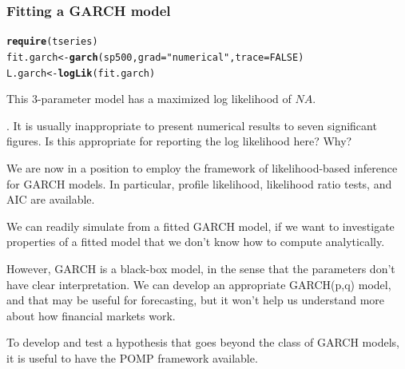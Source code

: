 \documentclass{beamer}\usepackage[]{graphicx}\usepackage[]{color}
\makeatletter
\newcommand{\hlnum}[1]{\textcolor[rgb]{0.686,0.059,0.569}{#1}}%
\newcommand{\hlstr}[1]{\textcolor[rgb]{0.192,0.494,0.8}{#1}}%
\newcommand{\hlstd}[1]{\textcolor[rgb]{0.345,0.345,0.345}{#1}}%
\newcommand{\hlkwb}[1]{\textcolor[rgb]{0.69,0.353,0.396}{#1}}%
\newcommand{\hlkwc}[1]{\textcolor[rgb]{0.333,0.667,0.333}{#1}}%
\newcommand{\hlkwd}[1]{\textcolor[rgb]{0.737,0.353,0.396}{\textbf{#1}}}%
\newenvironment{kframe}{%
 \def\at@end@of@kframe{}%
 \ifinner\ifhmode%
  \def\at@end@of@kframe{\end{minipage}}%
  \begin{minipage}{\columnwidth}%
 \fi\fi%
 \def\FrameCommand##1{\hskip\@totalleftmargin \hskip-\fboxsep
 \colorbox{shadecolor}{##1}\hskip-\fboxsep
     \hskip-\linewidth \hskip-\@totalleftmargin \hskip\columnwidth}%
 \MakeFramed {\advance\hsize-\width
   \@totalleftmargin\z@ \linewidth\hsize
   \@setminipage}}%
 {\par\unskip\endMakeFramed%
 \at@end@of@kframe}
\newenvironment{knitrout}{}{} %
\newcommand\answer[2]{#1} %
\makeatother
\begin{document}
\begin{frame}[fragile]

\frametitle{Fitting a GARCH model}

\begin{knitrout}\small
{}\color{fgcolor}\begin{kframe}
\begin{alltt}
\hlkwd{require}\hlstd{(tseries)}
\hlstd{fit.garch} \hlkwb{<-} \hlkwd{garch}\hlstd{(sp500,}\hlkwc{grad} \hlstd{=} \hlstr{"numerical"}\hlstd{,} \hlkwc{trace} \hlstd{=} \hlnum{FALSE}\hlstd{)}
\hlstd{L.garch} \hlkwb{<-} \hlkwd{logLik}\hlstd{(fit.garch)}
\end{alltt}
\end{kframe}
\end{knitrout}

\bi

\item This 3-parameter model has a maximized log likelihood of $NA$.

\ei

\myquestion. It is usually inappropriate to present numerical results to seven significant figures. Is this appropriate for reporting the log likelihood here? Why?

\answer{\vspace{10mm}}{todo}

\end{frame}

\begin{frame}[fragile]

\bi

\item We are now in a position to employ the framework of likelihood-based inference for GARCH models. In particular, profile likelihood, likelihood ratio tests, and AIC are available.

\item We can readily simulate from a fitted GARCH model, if we want to investigate properties of a fitted model that we don't know how to compute analytically.

\item However, GARCH is a black-box model, in the sense that the parameters don't have clear interpretation. We can develop an appropriate GARCH(p,q) model, and that may be useful for forecasting, but it won't help us understand more about how financial markets work. 

\item To develop and test a hypothesis that goes beyond the class of GARCH models, it is useful to have the POMP framework available.

\ei

\end{frame}
\end{document}
